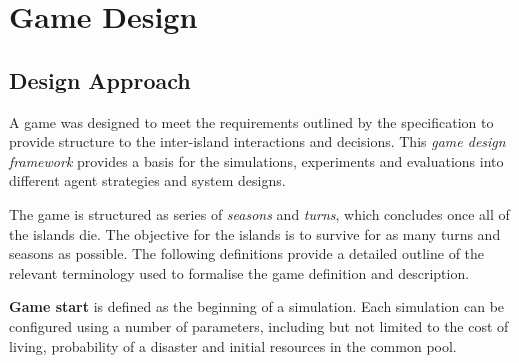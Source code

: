 \chapter{Game Design}

\section{Design Approach}

A game was designed to meet the requirements outlined by the specification to provide structure to the inter-island interactions and decisions. This \emph{game design framework} provides a basis for the simulations, experiments and evaluations into different agent strategies and system designs.

The game is structured as series of \emph{seasons} and \emph{turns}, which concludes once all of the islands die. The objective for the islands is to survive for as many turns and seasons as possible. The following definitions provide a detailed outline of the relevant terminology used to formalise the game definition and description.


\begin{definition} \label{def:gamestart}
    \textbf{Game start} is defined as the beginning of a simulation. Each simulation can be configured using a number of parameters, including but not limited to the cost of living, probability of a disaster and initial resources in the common pool.
\end{definition}

